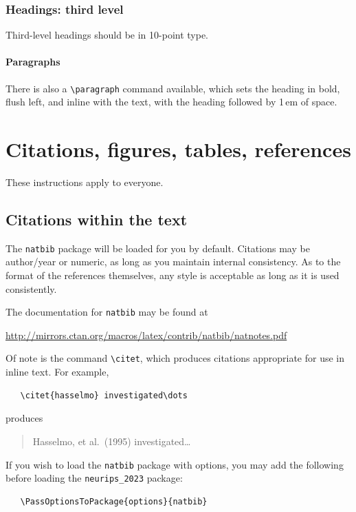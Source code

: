\documentclass{article}
\begin{document}
\subsubsection{Headings: third level}


Third-level headings should be in 10-point type.


\paragraph{Paragraphs}


There is also a \verb+\paragraph+ command available, which sets the heading in
bold, flush left, and inline with the text, with the heading followed by 1\,em
of space.


\section{Citations, figures, tables, references}
\label{others}


These instructions apply to everyone.


\subsection{Citations within the text}


The \verb+natbib+ package will be loaded for you by default.  Citations may be
author/year or numeric, as long as you maintain internal consistency.  As to the
format of the references themselves, any style is acceptable as long as it is
used consistently.


The documentation for \verb+natbib+ may be found at
\begin{center}
  \url{http://mirrors.ctan.org/macros/latex/contrib/natbib/natnotes.pdf}
\end{center}
Of note is the command \verb+\citet+, which produces citations appropriate for
use in inline text.  For example,
\begin{verbatim}
   \citet{hasselmo} investigated\dots
\end{verbatim}
produces
\begin{quote}
  Hasselmo, et al.\ (1995) investigated\dots
\end{quote}


If you wish to load the \verb+natbib+ package with options, you may add the
following before loading the \verb+neurips_2023+ package:
\begin{verbatim}
   \PassOptionsToPackage{options}{natbib}
\end{verbatim}
\end{document}
